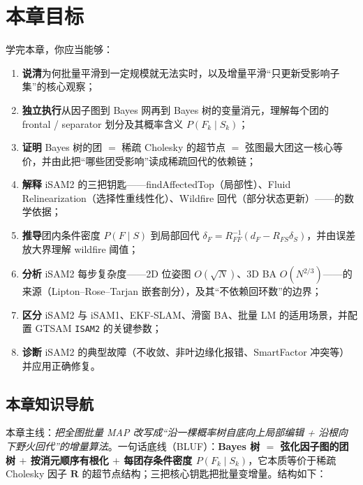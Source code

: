 \section*{本章目标}
学完本章，你应当能够：
\begin{enumerate}
  \item \textbf{说清}为何批量平滑到一定规模就无法实时，以及增量平滑“只更新受影响子集”的核心观察；
  \item \textbf{独立执行}从因子图到 Bayes 网再到 Bayes 树的变量消元，理解每个团的 frontal / separator 划分及其概率含义 $P(F_k\mid S_k)$；
  \item \textbf{证明} Bayes 树的团 $=$ 稀疏 Cholesky 的超节点 $=$ 弦图最大团这一核心等价，并由此把“哪些团受影响”读成稀疏回代的依赖链；
  \item \textbf{解释} iSAM2 的三把钥匙——findAffectedTop（局部性）、Fluid Relinearization（选择性重线性化）、Wildfire 回代（部分状态更新）——的数学依据；
  \item \textbf{推导}团内条件密度 $P(F\mid S)$ 到局部回代 $\delta_F=R_{FF}^{-1}(d_F-R_{FS}\delta_S)$，并由误差放大界理解 wildfire 阈值；
  \item \textbf{分析} iSAM2 每步复杂度——2D 位姿图 $O(\sqrt N)$、3D BA $O(N^{2/3})$——的来源（Lipton--Rose--Tarjan 嵌套剖分），及其“不依赖回环数”的边界；
  \item \textbf{区分} iSAM2 与 iSAM1、EKF-SLAM、滑窗 BA、批量 LM 的适用场景，并配置 GTSAM \texttt{ISAM2} 的关键参数；
  \item \textbf{诊断} iSAM2 的典型故障（不收敛、非叶边缘化报错、SmartFactor 冲突等）并应用正确修复。
\end{enumerate}

\subsection*{本章知识导航}
本章主线：\emph{把全图批量 MAP 改写成“沿一棵概率树自底向上局部编辑 + 沿根向下野火回代”的增量算法}。一句话底线（BLUF）：\textbf{Bayes 树 $=$ 弦化因子图的团树 $+$ 按消元顺序有根化 $+$ 每团存条件密度 $P(F_k\mid S_k)$}，它本质等价于稀疏 Cholesky 因子 $\mathbf{R}$ 的超节点结构\cite{kaess2012isam2,liu1990elimination}；三把核心钥匙把批量变增量。结构如下：

